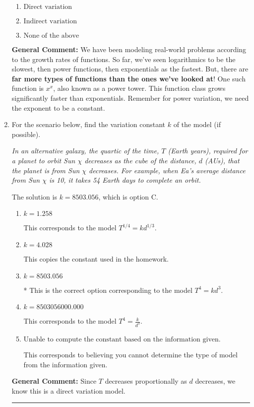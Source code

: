 \documentclass{extbook}[14pt]
\newcommand{\litem}[1]{\item #1

\rule{\textwidth}{0.4pt}}
\begin{document}
\begin{enumerate}
{\begin{enumerate}[label=\Alph*.]
\item \( \text{Direct variation} \)


\item \( \text{Indirect variation} \)


\item \( \text{None of the above} \)


\end{enumerate}

\textbf{General Comment:} We have been modeling real-world problems according to the growth rates of functions. So far, we've seen logarithmics to be the slowest, then power functions, then exponentials as the fastest. But, there are \textbf{far more types of functions than the ones we've looked at}! One such function is $x^x$, also known as a power tower. This function class grows significantly faster than exponentials. Remember for power variation, we need the exponent to be a constant.
}
\litem{
For the scenario below, find the variation constant $k$ of the model (if possible).

\begin{center}
    \textit{ In an alternative galaxy, the quartic of the time, $T$ (Earth years), required for a planet to orbit Sun $\chi$ decreases as the cube of the distance, $d$ (AUs), that the planet is from Sun $\chi$ decreases. For example, when Ea's average distance from Sun $\chi$ is 10, it takes 54 Earth days to complete an orbit. }
\end{center}
The solution is \( k = 8503.056 \), which is option C.\begin{enumerate}[label=\Alph*.]
\item \( k = 1.258 \)

This corresponds to the model $T^{1/4} = k d^{1/3}$.
\item \( k = 4.028 \)

This copies the constant used in the homework.
\item \( k = 8503.056 \)

* This is the correct option corresponding to the model $T^{4} = k d^{3}$.
\item \( k = 8503056000.000 \)

This corresponds to the model $T^{4} = \frac{k}{d^{3}}$.
\item \( \text{Unable to compute the constant based on the information given.} \)

This corresponds to believing you cannot determine the type of model from the information given.
\end{enumerate}

\textbf{General Comment:} Since $T$ decreases proportionally as $d$ decreases, we know this is a direct variation model.
}
\end{enumerate}
\end{document}
